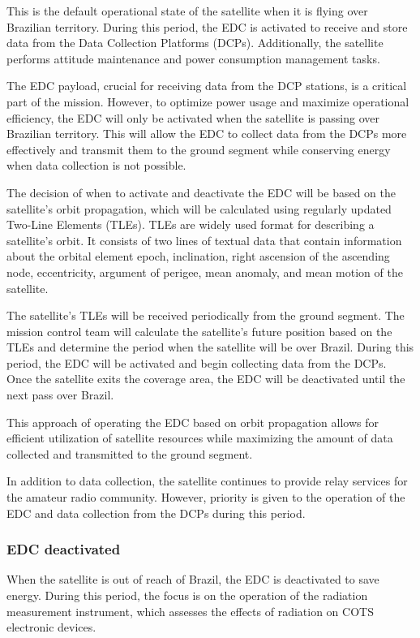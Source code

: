 This is the default operational state of the satellite when it is flying over Brazilian territory. During this period, the EDC is activated to receive and store data from the Data Collection Platforms (DCPs). Additionally, the satellite performs attitude maintenance and power consumption management tasks.

The EDC payload, crucial for receiving data from the DCP stations, is a critical part of the mission. However, to optimize power usage and maximize operational efficiency, the EDC will only be activated when the satellite is passing over Brazilian territory. This will allow the EDC to collect data from the DCPs more effectively and transmit them to the ground segment while conserving energy when data collection is not possible.

The decision of when to activate and deactivate the EDC will be based on the satellite's orbit propagation, which will be calculated using regularly updated Two-Line Elements (TLEs). TLEs are widely used format for describing a satellite's orbit. It consists of two lines of textual data that contain information about the orbital element epoch, inclination, right ascension of the ascending node, eccentricity, argument of perigee, mean anomaly, and mean motion of the satellite.

The satellite's TLEs will be received periodically from the ground segment. The mission control team will calculate the satellite's future position based on the TLEs and determine the period when the satellite will be over Brazil. During this period, the EDC will be activated and begin collecting data from the DCPs. Once the satellite exits the coverage area, the EDC will be deactivated until the next pass over Brazil.

This approach of operating the EDC based on orbit propagation allows for efficient utilization of satellite resources while maximizing the amount of data collected and transmitted to the ground segment.

In addition to data collection, the satellite continues to provide relay services for the amateur radio community. However, priority is given to the operation of the EDC and data collection from the DCPs during this period.

\subsubsection{EDC deactivated}

When the satellite is out of reach of Brazil, the EDC is deactivated to save energy. During this period, the focus is on the operation of the radiation measurement instrument, which assesses the effects of radiation on COTS electronic devices.

